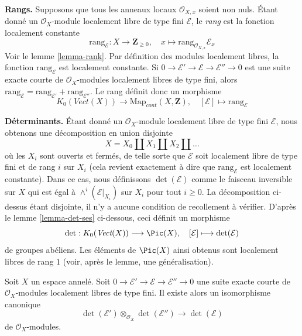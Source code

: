 \medskip\noindent
{\bf Rangs.} Supposons que tous les anneaux locaux $\mathcal{O}_{X, x}$ soient non nuls.
Étant donné un $\mathcal{O}_X$-module localement libre de type fini $\mathcal{E}$,
le {\it rang} est la fonction localement constante
$$
\text{rang}_\mathcal{E} : X \longrightarrow \mathbf{Z}_{\geq 0},\quad
x \longmapsto \text{rang}_{\mathcal{O}_{X, x}} \mathcal{E}_x
$$
Voir le lemme \ref{lemma-rank}. Par définition des modules localement
libres, la fonction $\text{rang}_\mathcal{E}$ est localement constante. Si
$0 \to \mathcal{E}' \to \mathcal{E} \to \mathcal{E}'' \to 0$
est une suite exacte courte de $\mathcal{O}_X$-modules localement libres de type fini,
alors $\text{rang}_\mathcal{E} = \text{rang}_{\mathcal{E}'} +
\text{rang}_{\mathcal{E}''}$.
Le rang définit donc un morphisme
$$
K_0(\textit{Vect}(X)) \longrightarrow \text{Map}_{cont}(X, \mathbf{Z}),\quad
[\mathcal{E}] \longmapsto \text{rang}_\mathcal{E}
$$

\medskip\noindent
{\bf Déterminants.} Étant donné un
$\mathcal{O}_X$-module localement libre de type fini $\mathcal{E}$, nous obtenons une
décomposition en union disjointe
$$
X = X_0 \amalg X_1 \amalg X_2 \amalg \ldots
$$
où les $X_i$ sont ouverts et fermés, de telle sorte que $\mathcal{E}$ soit localement
libre de type fini et de rang $i$ sur $X_i$ (cela revient exactement à dire que
$\text{rang}_\mathcal{E}$ est localement constante). Dans ce cas, nous définissons
$\det(\mathcal{E})$ comme le faisceau inversible sur $X$ qui est égal à
$\wedge^i(\mathcal{E}|_{X_i})$ sur $X_i$ pour tout $i \geq 0$.
La décomposition ci-dessus étant disjointe, il n'y a aucune condition de recollement
à vérifier. D'après le lemme \ref{lemma-det-ses} ci-dessous,
ceci définit un morphisme
$$
\det : K_0(\textit{Vect}(X)) \longrightarrow \Pic(X),\quad
[\mathcal{E}] \longmapsto \det(\mathcal{E})
$$
de groupes abéliens. Les éléments de $\Pic(X)$ ainsi obtenus
sont localement libres de rang $1$ (voir, après le lemme, une généralisation).

\begin{lemma}
\label{lemma-det-ses}
Soit $X$ un espace annelé. Soit
$0 \to \mathcal{E}' \to \mathcal{E} \to \mathcal{E}'' \to 0$
une suite exacte courte de $\mathcal{O}_X$-modules localement libres de type fini.
Il existe alors un isomorphisme canonique
$$
\det(\mathcal{E}') \otimes_{\mathcal{O}_X}\det(\mathcal{E}'')
\longrightarrow
\det(\mathcal{E})
$$
de $\mathcal{O}_X$-modules.
\end{lemma}

